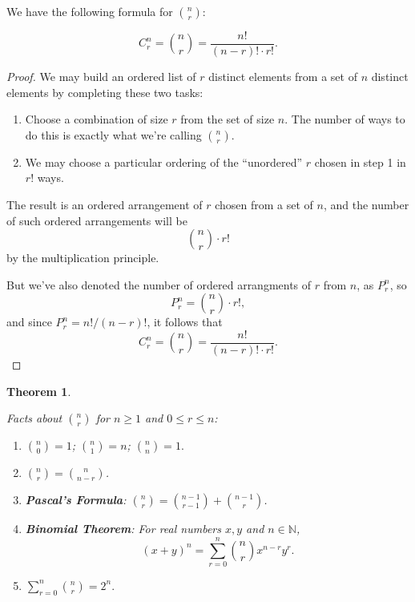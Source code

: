 \documentclass[
]{book}
\providecommand{\tightlist}{%
  \setlength{\itemsep}{0pt}\setlength{\parskip}{0pt}}
\newtheorem{theorem}{Theorem}[chapter]
\theoremstyle{definition}
\theoremstyle{definition}
\theoremstyle{definition}
\theoremstyle{definition}
\theoremstyle{remark}
\begin{document}
We have the following formula for \(\displaystyle \binom{n}{r}\):

\begin{equation} 
  C^n_r = \binom{n}{r} = \frac{n!}{(n-r)!\cdot r!}.
  \label{eq:Cnr}
\end{equation}

\begin{proof}
We may build an ordered list of \(r\) distinct elements from a set of \(n\) distinct elements by completing these two tasks:

\begin{enumerate}
\def\labelenumi{\arabic{enumi}.}
\tightlist
\item
  Choose a combination of size \(r\) from the set of size \(n\). The number of ways to do this is exactly what we're calling \(\binom{n}{r}\).
\item
  We may choose a particular ordering of the ``unordered'' \(r\) chosen in step 1 in \(r!\) ways.
\end{enumerate}

The result is an ordered arrangement of \(r\) chosen from a set of \(n\), and the number of such ordered arrangements will be \[\binom{n}{r} \cdot r!\] by the multiplication principle.

But we've also denoted the number of ordered arrangments of \(r\) from \(n\), as \(P^n_r\), so \[P^n_r = \binom{n}{r} \cdot r!,\] and since \(P^n_r = n!/(n-r)!\), it follows that
\[C^n_r = \binom{n}{r} = \frac{n!}{(n-r)!\cdot r!}.\]
\end{proof}

\begin{theorem}
\protect\hypertarget{thm:Cnrfacts}{}\label{thm:Cnrfacts}

Facts about \(\displaystyle \binom{n}{r}\) for \(n \geq 1\) and \(0 \leq r \leq n\):

\begin{enumerate}
\def\labelenumi{\arabic{enumi}.}
\tightlist
\item
  \(\displaystyle \binom{n}{0} = 1\); \(\displaystyle \binom{n}{1}=n\); \(\displaystyle \binom{n}{n}=1.\)
\item
  \(\displaystyle \binom{n}{r} = \binom{n}{n-r}\).
\item
  \textbf{Pascal's Formula}: \(\displaystyle \binom{n}{r} = \binom{n-1}{r-1} + \binom{n-1}{r}\).
\item
  \textbf{Binomial Theorem}: For real numbers \(x, y\) and \(n\in\mathbb{N}\), \[(x+y)^n = \sum_{r=0}^n \binom{n}{r}x^{n-r}y^r.\]
\item
  \(\displaystyle \sum_{r = 0}^n \binom{n}{r} = 2^n.\)
\end{enumerate}

\end{theorem}
\end{document}
